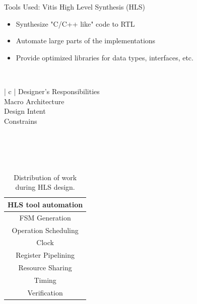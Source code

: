 \begin{frame}{Tools Used: Vitis High Level Synthesis (HLS)}
	\begin{itemize}
	    \item Synthesize "C/C++ like" code to RTL
	    \item Automate large parts of the implementations
	    \item Provide optimized libraries for data types, interfaces, etc.
	\end{itemize}\\
	\begin{table}[H]
        \center
        \small
        \begin{tabular}{ | c | }
            \hline
            Designer's Responsibilities\\
            \hline
            Macro Architecture\\
            Design Intent\\
            Constrains\\
            \hline
             \\
             \\
             \\
             \\
        \end{tabular}
        \quad
        \begin{tabular}{ | c | }
            \hline
            HLS tool automation\\
            \hline
            FSM Generation\\
            Operation Scheduling\\
            Clock\\
            Register Pipelining\\
            Resource Sharing\\
            Timing\\
            Verification\\
            \hline
        \end{tabular}
        \caption*{Distribution of work during HLS design.}
    \end{table}
\end{frame}

